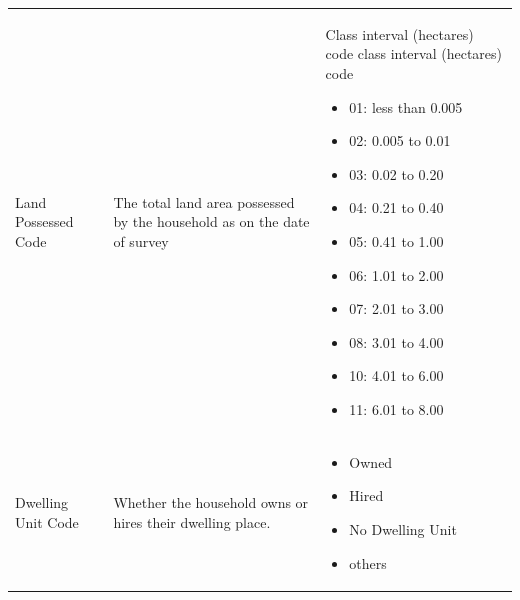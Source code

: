 \begin{tabular}{lp{6cm}p{6cm}}
	Land Possessed Code & The total land area possessed by the household as on the date of survey & Class interval (hectares) code class interval (hectares) code
	\begin{itemize}[left=0pt, topsep=0pt, partopsep=0pt, itemsep=0pt, parsep=0pt]
		\item 01: less than 0.005
		\item 02: 0.005 to 0.01
		\item 03: 0.02 to 0.20
		\item 04: 0.21 to 0.40
		\item 05: 0.41 to 1.00
		\item 06: 1.01 to 2.00
		\item 07: 2.01 to 3.00
		\item 08: 3.01 to 4.00 
		\item 10: 4.01 to 6.00
		\item 11: 6.01 to 8.00
	\end{itemize}\\
	\addlinespace
	
	Dwelling Unit Code & Whether the household owns or hires their dwelling place. & 
	 \vspace{-7pt}
	\begin{itemize}[left=0pt, topsep=0pt, partopsep=0pt, itemsep=0pt, parsep=0pt]
		\item Owned
		\item Hired
		\item No Dwelling Unit
		\item others
	\end{itemize}\\
	\bottomrule
\end{tabular}
